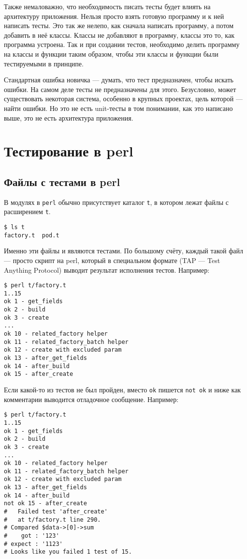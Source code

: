 Также немаловажно, что необходимость писать тесты будет влиять на архитектуру приложения. Нельзя просто взять готовую программу и к ней написать тесты. Это так же нелепо, как сначала написать программу, а потом добавить в неё классы. Классы не добавляют в программу, классы это то, как программа устроена. Так и при создании тестов, необходимо делить программу на классы и функции таким образом, чтобы эти классы и функции были тестируемыми в принципе.

Стандартная ошибка новичка --- думать, что тест предназначен, чтобы искать ошибки. На самом деле тесты не предназначены для этого. Безусловно, может существовать некоторая система, особенно в крупных проектах, цель которой --- найти ошибки. Но это не есть unit-тесты в том понимании, как это написано выше, это не есть архитектура приложения.

\section{Тестирование в perl}
\subsection{Файлы с тестами в perl}
В модулях в \verb|perl| обычно присутствует каталог \verb|t|, в котором лежат файлы с расширением \verb|t|.
\begin{verbatim}
$ ls t
factory.t  pod.t
\end{verbatim}
Именно эти файлы и являются тестами. По большому счёту, каждый такой файл --- просто скрипт на perl, который в специальном формате (TAP --- Test Anything Protocol) выводит результат исполнения тестов. Например:
\begin{verbatim}
$ perl t/factory.t
1..15
ok 1 - get_fields
ok 2 - build
ok 3 - create
...
ok 10 - related_factory helper
ok 11 - related_factory_batch helper
ok 12 - create with excluded param
ok 13 - after_get_fields
ok 14 - after_build
ok 15 - after_create
\end{verbatim}
Если какой-то из тестов не был пройден, вместо \verb|ok| пишется \verb|not ok| и ниже как комментарии выводится отладочное сообщение. Например:
\begin{verbatim}
$ perl t/factory.t
1..15
ok 1 - get_fields
ok 2 - build
ok 3 - create
...
ok 10 - related_factory helper
ok 11 - related_factory_batch helper
ok 12 - create with excluded param
ok 13 - after_get_fields
ok 14 - after_build
not ok 15 - after_create
#   Failed test 'after_create'
#   at t/factory.t line 290.
# Compared $data->[0]->sum
#    got : '123'
# expect : '1123'
# Looks like you failed 1 test of 15.
\end{verbatim}


